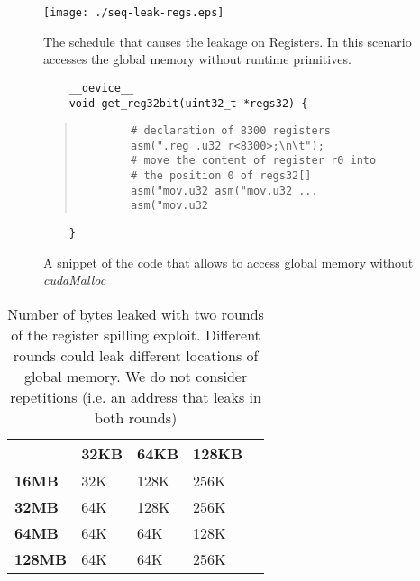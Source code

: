 \documentclass[11pt,onecolumn,letterpaper]{IEEEtran}
\begin{document}
\begin{figure}[t]
\begin{center}
	\texttt{[image: ./seq-leak-regs.eps]}
	\caption{The schedule that causes the leakage on Registers.
			In this scenario  accesses the global memory without runtime primitives.}
	\label{fig:regs_attack}
\end{center}
\end{figure}
\begin{figure}
{
	\fontsize{8pt}{10pt}\selectfont
	\begin{verbatim}
	__device__
	void get_reg32bit(uint32_t *regs32) {
	\end{verbatim}
	\begin{quote}
	
		\begin{verbatim}
		# declaration of 8300 registers
		asm(".reg .u32 r<8300>;\n\t");
		# move the content of register r0 into
		# the position 0 of regs32[]
		asm("mov.u32 asm("mov.u32 ...
		asm("mov.u32 \end{verbatim}
	
	\end{quote}
	\begin{verbatim}
	}
	\end{verbatim}

}
\label{fig:snip-reg-attack}
\caption{A snippet of the code that allows to access global memory without \emph{cudaMalloc}}
\end{figure}


\begin{center}
\begin{table}
	\centering
	\caption{Number of bytes leaked with two rounds of the register spilling exploit. Different
			 rounds could leak different locations of global memory. We do not consider repetitions (i.e.
			 an address that leaks in both rounds)}
\begin{tabular}{| l | l | l | l | l |}
	\hline
		& \textbf{32KB} & \textbf{64KB} & \textbf{128KB}\\
		 \hline
		 \textbf{16MB} &  32K & 128K & 256K \\
		 \hline
		 \textbf{32MB} &  64K & 128K & 256K \\
		 \hline
		 \textbf{64MB} &  64K & 64K  & 128K \\
		 \hline
		 \textbf{128MB}&  64K & 64K  & 256K \\
	\hline 	 	 	
	\end{tabular}
	\smallskip
	\smallskip
\label{tab:reg-attack-summary}
\end{table}
\end{center}
\end{document}
